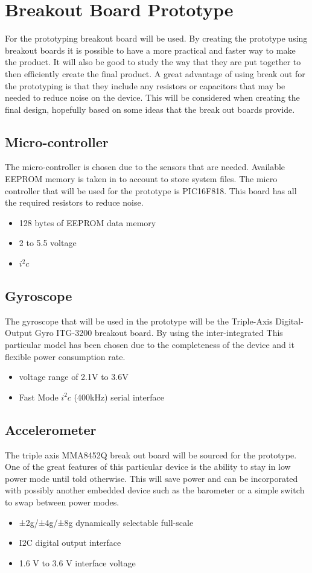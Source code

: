 \documentclass{report}
\begin{document}
\section{Breakout Board Prototype}
For the prototyping breakout board will be used. By creating the prototype using breakout boards it is possible to have a more practical and faster way to make the product. It will also be good to study the way that they are put together to then efficiently create the final product. A great advantage of using break out for the prototyping is that they include any resistors or capacitors that may be needed to reduce noise on the device. This will be considered when creating the final design, hopefully based on some ideas that the break out boards provide.
 
\subsection{Micro-controller}
The micro-controller is chosen due to the sensors that are needed. Available EEPROM memory is taken in to account to store system files. The micro controller that will be used for the prototype is PIC16F818. This board has all the required resistors to reduce noise. 
\begin{itemize}
\item 128 bytes of EEPROM data memory
\item 2 to 5.5 voltage
\item $i^2c$
\end{itemize}

\subsection{Gyroscope}
The gyroscope that will be used in the prototype will be the Triple-Axis Digital-Output Gyro ITG-3200 breakout board. By using the inter-integrated 
This particular model has been chosen due to the completeness of the device and it flexible power consumption rate.
\begin{itemize}
\item voltage range of 2.1V to 3.6V
\item Fast Mode $i^2c$ (400kHz) serial interface
\end{itemize}
\subsection{Accelerometer}
The triple axis MMA8452Q break out board will be sourced for the prototype. One of the great features of this particular device is the ability to stay in low power mode until told otherwise. This will save power and can be incorporated with possibly another embedded device such as the barometer or a simple switch to swap between power modes.
\begin{itemize}
\item ±2g/±4g/±8g dynamically selectable full-scale
\item I2C digital output interface
\item 1.6 V to 3.6 V interface voltage
\end{itemize}
\end{document}
